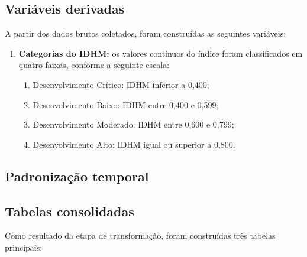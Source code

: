 \subsection{Variáveis derivadas}

A partir dos dados brutos coletados, foram construídas as seguintes variáveis:

\begin{enumerate}
    \item \textbf{Categorias do IDHM:} os valores contínuos do índice foram classificados em quatro faixas, conforme a seguinte escala:
    \begin{enumerate}
        \item Desenvolvimento Crítico: IDHM inferior a 0,400;
        \item Desenvolvimento Baixo: IDHM entre 0,400 e 0,599;
        \item Desenvolvimento Moderado: IDHM entre 0,600 e 0,799;
        \item Desenvolvimento Alto: IDHM igual ou superior a 0,800.
    \end{enumerate}
\end{enumerate}

\subsection{Padronização temporal}


\subsection{Tabelas consolidadas}

Como resultado da etapa de transformação, foram construídas três tabelas principais:

